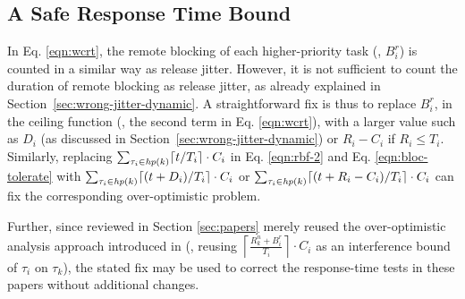 \subsection{A Safe Response Time Bound}
\label{sec:safe_bound}

In Eq. \eqref{eqn:wcrt}, the remote blocking of each higher-priority task (\ie, $B_i^r$) is counted in a similar way as release jitter. However, it is not sufficient to count the duration of remote blocking as release jitter, as already explained in Section~\ref{sec:wrong-jitter-dynamic}. A straightforward fix is thus to replace $B_i^r$, in the ceiling function (\ie, the second term in Eq. \eqref{eqn:wcrt}), with a larger value such as $D_i$ (as discussed in Section~\ref{sec:wrong-jitter-dynamic}) or $R_i - C_i$ if $R_i \leq T_i$. Similarly, replacing $\sum_{\tau_i \in \mathit{hp}(k)} \lceil t / T_i \rceil \cdot C_i$ in Eq. \eqref{eqn:rbf-2} and Eq. \eqref{eqn:bloc-tolerate} with $\sum_{\tau_i \in \mathit{hp}(k)} \lceil (t+D_i) / T_i \rceil \cdot C_i$ or $\sum_{\tau_i \in \mathit{hp}(k)} \lceil (t+R_i-C_i) / T_i \rceil \cdot C_i$ can fix the corresponding over-optimistic problem.

Further, since \cite{zeng-2011,bbb-2013,yang-2013,kim-2014,han-2014,carminati-2014,yang-2014} reviewed in Section \ref{sec:papers} merely reused the over-optimistic analysis approach introduced in \cite{lakshmanan-2009} (\ie, reusing $\left \lceil \frac{R_k^n + B_i^r}{T_i} \right \rceil \cdot C_i$ as an interference bound of $\tau_i$ on $\tau_k$), the stated fix may be used to correct the response-time tests in these papers without additional changes.


  
  




  